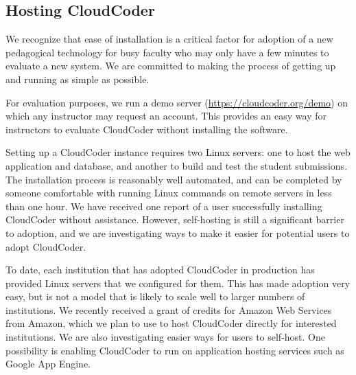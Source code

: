 \documentclass{sig-alternate}
\begin{document}




\subsection{Hosting CloudCoder}

We recognize that ease of installation is a critical factor for
adoption of a new pedagogical technology for busy
faculty who may only have a few minutes to evaluate a new system.  We
are committed to making the process
of getting up and running as simple as possible.

For evaluation purposes, we run a demo server
(\url{https://cloudcoder.org/demo}) on which any instructor may request
an account.  This provides an easy way for instructors to evaluate
CloudCoder without installing the software.

Setting up a CloudCoder instance requires two Linux servers: one to
host the web application and database, and another to build and
test the student submissions.  The installation process is reasonably well
automated, and can be completed by someone comfortable with
running Linux commands on remote servers in less than one hour.
We have received one report of a user successfully installing CloudCoder
without assistance.  However, self-hosting is still a significant
barrier to adoption, and we are investigating ways to make it
easier for potential users to adopt CloudCoder.

To date, each institution that has adopted CloudCoder in production has
provided Linux servers that we configured for them.  This has made
adoption very easy, but is not a model that is likely to scale well
to larger numbers of institutions.  We recently received a grant
of credits for Amazon Web Services\cite{aws} from Amazon,
which we plan to use to host CloudCoder directly for interested
institutions.  We are also investigating easier ways for
users to self-host. One possibility is enabling CloudCoder to run on application
hosting services such as Google App Engine\cite{gae}.
\end{document}

